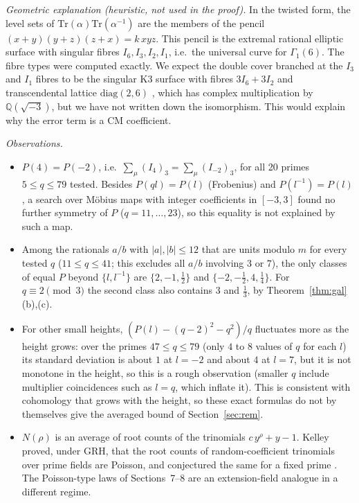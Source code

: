 \documentclass[11pt]{article}
\begin{document}
\emph{Geometric explanation (heuristic, not used in the proof).} In the twisted form, the level sets of $\mathrm{Tr}(\alpha)\mathrm{Tr}(\alpha^{-1})$ are the members of the pencil
$(x+y)(y+z)(z+x)=k\,xyz$. This pencil is the extremal rational elliptic surface with singular fibres $I_6,I_3,I_2,I_1$, i.e.\ the universal curve for $\Gamma_1(6)$.
The fibre types were computed exactly. We expect the double cover branched at the $I_3$ and $I_1$ fibres to be the singular K3 surface with fibres $3I_6+3I_2$ and transcendental
lattice $\mathrm{diag}(2,6)$ \cite{HS}, which has complex multiplication by $\mathbb Q(\sqrt{-3})$, but we have not written down the isomorphism. This would explain why the error term is a CM coefficient.

\emph{Observations.}
\begin{itemize}
\item $P(4)=P(-2)$, i.e.\ $\sum_\mu(I_4)_3=\sum_\mu(I_{-2})_3$, for all 20 primes $5\le q\le79$ tested. Besides $P(ql)=P(l)$ (Frobenius) and $P(l^{-1})=P(l)$, a search over M\"obius maps with integer coefficients in $[-3,3]$ found no further symmetry of $P$ ($q=11,\dots,23$), so this equality is not explained by such a map.
\item Among the rationals $a/b$ with $|a|,|b|\le12$ that are units modulo $m$ for every tested $q$ ($11\le q\le41$; this excludes all $a/b$ involving $3$ or $7$), the only classes of equal $P$ beyond $\{l,l^{-1}\}$ are $\{2,-1,\tfrac12\}$ and $\{-2,-\tfrac12,4,\tfrac14\}$. For $q\equiv2\pmod3$ the second class also contains $3$ and $\tfrac13$, by Theorem~\ref{thm:gal}(b),(c).
\item For other small heights, $(P(l)-(q-2)^2-q^2)/q$ fluctuates more as the height grows: over the primes $47\le q\le79$ (only $4$ to $8$ values of $q$ for each $l$) its standard deviation is about $1$ at $l=-2$ and about $4$ at $l=7$, but it is not monotone in the height, so this is a rough observation (smaller $q$ include multiplier coincidences such as $l=q$, which inflate it). This is consistent with cohomology that grows with the height, so these exact formulas do not by themselves give the averaged bound of Section~\ref{sec:rem}.
\item $N(\rho)$ is an average of root counts of the trinomials $c\,y^\rho+y-1$. Kelley proved, under GRH, that the root counts of random-coefficient trinomials over prime fields are Poisson, and conjectured the same for a fixed prime \cite{Ke,KO,BCR}. The Poisson-type laws of Sections~7--8 are an extension-field analogue in a different regime.
\end{itemize}
\end{document}

